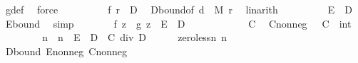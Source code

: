 \begin{isabellebody}
\ g{\isacharunderscore}{\kern0pt}def\ \isamarkupfalse%
\ force\isanewline
\ \ \ \ \isamarkupfalse%
\ \isamarkupfalse%
\ {\isachardoublequoteopen}{\isachardot}{\kern0pt}{\isachardot}{\kern0pt}{\isachardot}{\kern0pt}\ {\isasymle}\ {\isasymbar}f\ {\isacharquery}{\kern0pt}r{\isasymbar}\ {\isacharplus}{\kern0pt}\ D{\isachardoublequoteclose}\ \isamarkupfalse%
\ D{\isacharunderscore}{\kern0pt}bound{\isacharparenleft}{\kern0pt}{}{\isacharparenright}{\kern0pt}{\isacharbrackleft}{\kern0pt}of\ {\isachardoublequoteopen}{\isacharquery}{\kern0pt}d\ {\isacharasterisk}{\kern0pt}\ M{\isachardoublequoteclose}\ {\isachardoublequoteopen}{\isacharquery}{\kern0pt}r{\isachardoublequoteclose}{\isacharbrackright}{\kern0pt}\ \isamarkupfalse%
\ linarith\isanewline
\ \ \ \ \isamarkupfalse%
\ \isamarkupfalse%
\ {\isachardoublequoteopen}{\isachardot}{\kern0pt}{\isachardot}{\kern0pt}{\isachardot}{\kern0pt}\ {\isasymle}\ E\ {\isacharplus}{\kern0pt}\ D{\isachardoublequoteclose}\ \isamarkupfalse%
\ E{\isacharunderscore}{\kern0pt}bound\ \isamarkupfalse%
\ simp\isanewline
\ \ \ \ \isamarkupfalse%
\ \isamarkupfalse%
\ {\isachardoublequoteopen}{\isasymbar}f\ z\ {\isacharminus}{\kern0pt}\ g\ z{\isasymbar}\ {\isasymle}\ E\ {\isacharplus}{\kern0pt}\ D{\isachardoublequoteclose}\ \isacommand{{\isachardot}{\kern0pt}}\isamarkupfalse%
\isanewline
\ \ \isamarkupfalse%
\isanewline
\ \ \isacommand{{\isacharbraceleft}{\kern0pt}}\isamarkupfalse%
\isanewline
\ \ \ \ \isamarkupfalse%
\ C\ \isamarkupfalse%
\ C{\isacharunderscore}{\kern0pt}nonneg{\isacharcolon}{\kern0pt}\ {\isachardoublequoteopen}{}\ {\isasymle}\ {\isacharparenleft}{\kern0pt}C\ {\isacharcolon}{\kern0pt}{\isacharcolon}{\kern0pt}\ int{\isacharparenright}{\kern0pt}{\isachardoublequoteclose}\isanewline
\ \ \isanewline
\ \ \ \ \isamarkupfalse%
\ n\ \ {\isachardoublequoteopen}n\ {\isacharequal}{\kern0pt}\ {\isacharparenleft}{\kern0pt}E\ {\isacharplus}{\kern0pt}\ D\ {\isacharplus}{\kern0pt}\ C{\isacharparenright}{\kern0pt}\ div\ D{\isachardoublequoteclose}\isanewline
\ \ \ \ \isamarkupfalse%
\ zero{\isacharunderscore}{\kern0pt}less{\isacharunderscore}{\kern0pt}n{\isacharcolon}{\kern0pt}\ {\isachardoublequoteopen}n\ {\isachargreater}{\kern0pt}\ {}{\isachardoublequoteclose}\ \isamarkupfalse%
\ D{\isacharunderscore}{\kern0pt}bound{\isacharparenleft}{\kern0pt}{}{\isacharparenright}{\kern0pt}\ E{\isacharunderscore}{\kern0pt}nonneg\ C{\isacharunderscore}{\kern0pt}nonneg\ \isamarkupfalse%

\end{isabellebody}
